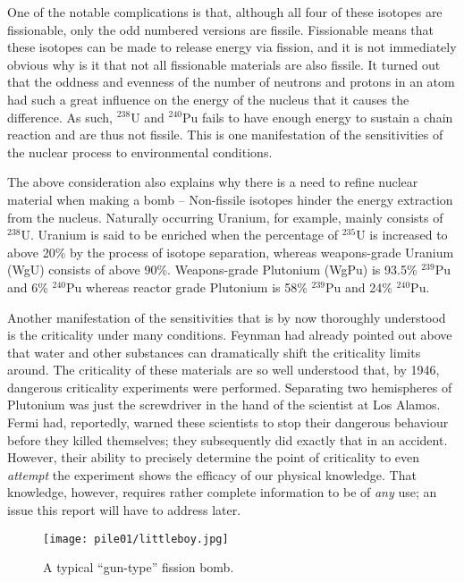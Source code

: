 \documentclass[twoside,titlepage,11pt,twocolumn,a4paper]{article}
\begin{document}
One of the notable complications is that, although all four of these
isotopes are fissionable, only the odd numbered versions are
fissile. Fissionable means that these isotopes can be made to release
energy via fission, and it is not immediately obvious why is it that
not all fissionable materials are also fissile. It turned out that the
oddness and evenness of the number of neutrons and protons in an atom
had such a great influence on the energy of the nucleus that it causes
the difference. As such, \( \mathrm{^{238}U} \) and \(
\mathrm{^{240}Pu} \) fails to have enough energy to sustain a chain
reaction and are thus not fissile. This is one manifestation of the
sensitivities of the nuclear process to environmental conditions.

The above consideration also explains why there is a need to refine
nuclear material when making a bomb -- Non-fissile isotopes hinder the
energy extraction from the nucleus. Naturally occurring Uranium, for
example, mainly consists of \( \mathrm{^{238}U} \).  Uranium is said
to be enriched when the percentage of \( \mathrm{^{235}U} \) is
increased to above 20\% by the process of isotope separation, whereas
weapons-grade Uranium (WgU) consists of above
90\%. \citep{blackmarket} Weapons-grade Plutonium (WgPu) is 93.5\% \(
\mathrm{^{239}Pu} \) and 6\% \( \mathrm{^{240}Pu} \) whereas reactor
grade Plutonium is 58\% \( \mathrm{^{239}Pu} \) and 24\% \(
\mathrm{^{240}Pu} \). \citep{drell1993}

Another manifestation of the sensitivities that is by now thoroughly
understood is the criticality under many conditions. Feynman had
already pointed out above that water and other substances can
dramatically shift the criticality limits
around. \citep{FeynmanJoking} The criticality of these materials are
so well understood that, by 1946, dangerous criticality experiments
were performed. Separating two hemispheres of Plutonium was just the
screwdriver in the hand of the scientist at Los
Alamos. \citep{criticalityAccidents1967} Fermi had, reportedly, warned
these scientists to stop their dangerous behaviour before they killed
themselves; they subsequently did exactly that in an
accident. However, their ability to precisely determine the point of
criticality to even \emph{attempt} the experiment shows the efficacy
of our physical knowledge. That knowledge, however, requires rather
complete information to be of \emph{any} use; an issue this report
will have to address later.

\begin{figure}
  \texttt{[image: pile01/littleboy.jpg]}
  \caption{A typical ``gun-type'' fission
    bomb. \citep{littleBoyAtomicArchive}}
\end{figure}
\end{document}
